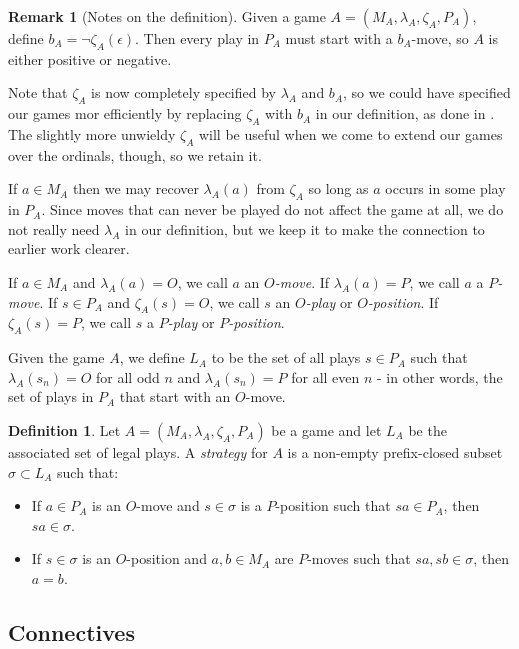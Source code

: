 \documentclass[11pt]{article} %
\theoremstyle{plain} %
\theoremstyle{definition} %
\newtheorem{definition}[theorem]{Definition}
\newtheorem{remark}[theorem]{Remark}
\theoremstyle{exercisestyle}
\newcommand{\emptyplay}{\epsilon}
\begin{document}
\begin{remark}[Notes on the definition]
  Given a game $A=(M_A,\lambda_A,\zeta_A,P_A)$, define $b_A=\neg\zeta_A(\emptyplay)$.  Then every play in $P_A$ must start with a $b_A$-move, so $A$ is either positive or negative.

  Note that $\zeta_A$ is now completely specified by $\lambda_A$ and $b_A$, so we could have specified our games mor efficiently by replacing $\zeta_A$ with $b_A$ in our definition, as done in \cite{martinsthesis}.  The slightly more unwieldy $\zeta_A$ will be useful when we come to extend our games over the ordinals, though, so we retain it.

  If $a\in M_A$ then we may recover $\lambda_A(a)$ from $\zeta_A$ so long as $a$ occurs in some play in $P_A$.  Since moves that can never be played do not affect the game at all, we do not really need $\lambda_A$ in our definition, but we keep it to make the connection to earlier work clearer.

  If $a\in M_A$ and $\lambda_A(a)=O$, we call $a$ an \emph{$O$-move}.  If $\lambda_A(a)=P$, we call $a$ a \emph{$P$-move}.  If $s\in P_A$ and $\zeta_A(s)=O$, we call $s$ an \emph{$O$-play} or \emph{$O$-position}.  If $\zeta_A(s)=P$, we call $s$ a \emph{$P$-play} or \emph{$P$-position}.

  Given the game $A$, we define $L_A$ to be the set of all plays $s\in P_A$ such that $\lambda_A(s_n)=O$ for all odd $n$ and $\lambda_A(s_n)=P$ for all even $n$ - in other words, the set of plays in $P_A$ that start with an $O$-move.
\end{remark}

\begin{definition}
  Let $A=(M_A,\lambda_A,\zeta_A,P_A)$ be a game and let $L_A$ be the associated set of legal plays.  A \emph{strategy} for $A$ is a non-empty prefix-closed subset $\sigma\subset L_A$ such that:
  \begin{itemize}
    \item If $a\in P_A$ is an $O$-move and $s\in\sigma$ is a $P$-position such that $sa\in P_A$, then $sa\in\sigma$.
    \item If $s\in\sigma$ is an $O$-position and $a,b\in M_A$ are $P$-moves such that $sa,sb\in\sigma$, then $a=b$.
  \end{itemize}
\end{definition}

\subsection{Connectives}
\end{document}

